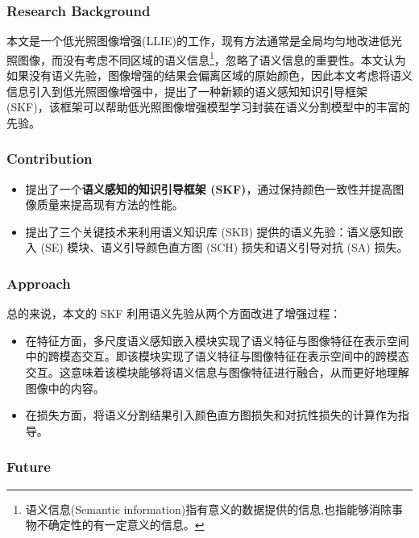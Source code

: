 \documentclass[letterpaper,10pt]{article}
\begin{document}
			\subsubsection{Research Background}
			
			本文是一个低光照图像增强(LLIE)的工作，现有方法通常是全局均匀地改进低光照图像，而没有考虑不同区域的语义信息\footnote{语义信息(Semantic information)指有意义的数据提供的信息,也指能够消除事物不确定性的有一定意义的信息。}，忽略了语义信息的重要性。本文认为如果没有语义先验，图像增强的结果会偏离区域的原始颜色，因此本文考虑将语义信息引入到低光照图像增强中，提出了一种新颖的语义感知知识引导框架 (SKF)，该框架可以帮助低光照图像增强模型学习封装在语义分割模型中的丰富的先验。
		
			\subsubsection{Contribution}
	
			\begin{itemize}
				\item [(1)]
				提出了一个\textbf{语义感知的知识引导框架 (SKF)}，通过保持颜色一致性并提高图像质量来提高现有方法的性能。
				\item [(2)]
				提出了三个关键技术来利用语义知识库 (SKB) 提供的语义先验：语义感知嵌入 (SE) 模块、语义引导颜色直方图 (SCH) 损失和语义引导对抗 (SA) 损失。
			\end{itemize}
		
		
			\subsubsection{Approach}
			
			总的来说，本文的 SKF 利用语义先验从两个方面改进了增强过程：
			
			\begin{itemize}
				\item [(1)]
				在特征方面，多尺度语义感知嵌入模块实现了语义特征与图像特征在表示空间中的跨模态交互。即该模块实现了语义特征与图像特征在表示空间中的跨模态交互。这意味着该模块能够将语义信息与图像特征进行融合，从而更好地理解图像中的内容。
				\item [(2)]
				在损失方面，将语义分割结果引入颜色直方图损失和对抗性损失的计算作为指导。
			\end{itemize}
			
			\subsubsection{Future}
			
\end{document}

